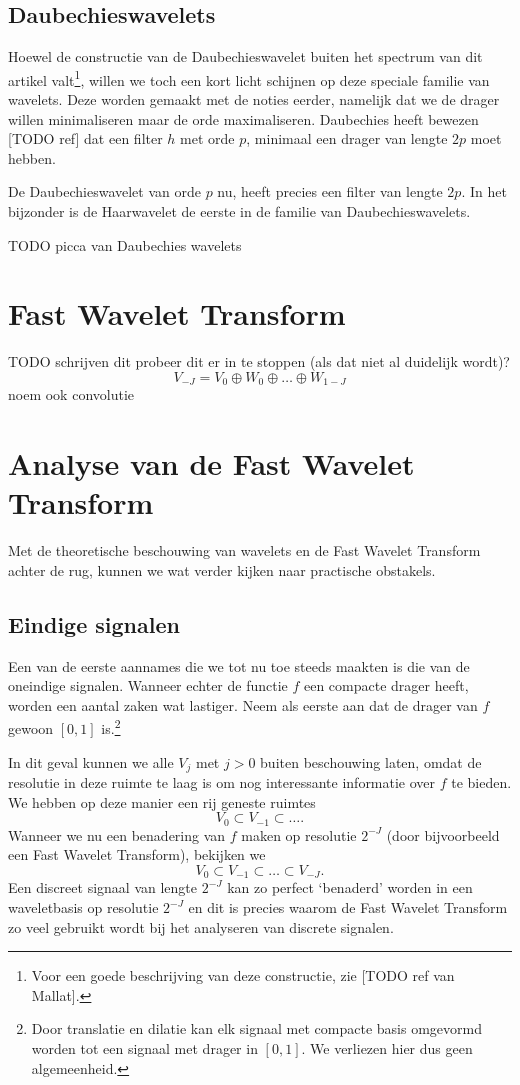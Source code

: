 \documentclass[11pt]{amsart}
\begin{document}
\subsection{Daubechieswavelets}
Hoewel de constructie van de Daubechieswavelet buiten het spectrum van dit artikel valt\footnote{Voor een goede beschrijving van deze constructie, zie [TODO ref van Mallat].}, willen we toch een kort licht schijnen op deze speciale familie van wavelets. Deze worden gemaakt met de noties eerder, namelijk dat we de drager willen minimaliseren maar de orde maximaliseren. Daubechies heeft bewezen [TODO ref] dat een filter $h$ met orde $p$, minimaal een drager van lengte $2p$ moet hebben. 

De Daubechieswavelet van orde $p$ nu, heeft precies een filter van lengte $2p$. In het bijzonder is de Haarwavelet de eerste in de familie van Daubechieswavelets.

TODO picca van Daubechies wavelets

\section{Fast Wavelet Transform}
TODO schrijven dit
probeer dit er in te stoppen (als dat niet al duidelijk wordt)?
\[
	V_{-J} = V_0 \oplus W_0 \oplus \ldots \oplus W_{1-J}
\]
noem ook convolutie

\section{Analyse van de Fast Wavelet Transform}
Met de theoretische beschouwing van wavelets en de Fast Wavelet Transform achter de rug, kunnen we wat verder kijken naar practische obstakels.

\subsection{Eindige signalen} 
Een van de eerste aannames die we tot nu toe steeds maakten is die van de oneindige signalen. Wanneer echter de functie $f$ een compacte drager heeft, worden een aantal zaken wat lastiger. Neem als eerste aan dat de drager van $f$ gewoon $[0,1]$ is.\footnote{Door translatie en dilatie kan elk signaal met compacte basis omgevormd worden tot een signaal met drager in $[0,1]$. We verliezen hier dus geen algemeenheid.}

In dit geval kunnen we alle $V_j$ met $j > 0$ buiten beschouwing laten, omdat de resolutie in deze ruimte te laag is om nog interessante informatie over $f$ te bieden. We hebben op deze manier een rij geneste ruimtes
\[
V_0 \subset V_{-1} \subset \ldots.
\]
Wanneer we nu een benadering van $f$ maken op resolutie $2^{-J}$ (door bijvoorbeeld een Fast Wavelet Transform), bekijken we
\[
	V_0 \subset V_{-1} \subset \ldots \subset V_{-J}.
\]
Een discreet signaal van lengte $2^{-J}$ kan zo perfect `benaderd' worden in een waveletbasis op resolutie $2^{-J}$ en dit is precies waarom de Fast Wavelet Transform zo veel gebruikt wordt bij het analyseren van discrete signalen.
\end{document}
